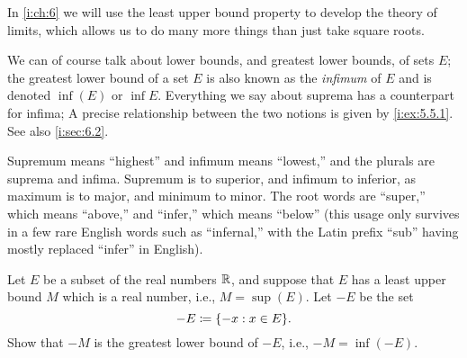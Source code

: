 \begin{rmk}\label{i:5.5.14}
  In \cref{i:ch:6} we will use the least upper bound property to develop the theory of limits, which allows us to do many more things than just take square roots.
\end{rmk}

\begin{rmk}\label{i:5.5.15}
  We can of course talk about lower bounds, and greatest lower bounds, of sets \(E\);
  the greatest lower bound of a set \(E\) is also known as the \emph{infimum} of \(E\) and is denoted \(\inf(E)\) or \(\inf E\).
  Everything we say about suprema has a counterpart for infima;
  A precise relationship between the two notions is given by \cref{i:ex:5.5.1}.
  See also \cref{i:sec:6.2}.
\end{rmk}

\begin{note}
  Supremum means ``highest'' and infimum means ``lowest,'' and the plurals are suprema and infima.
  Supremum is to superior, and infimum to inferior, as maximum is to major, and minimum to minor.
  The root words are ``super,'' which means ``above,'' and ``infer,'' which means ``below''
  (this usage only survives in a few rare English words such as ``infernal,'' with the Latin prefix ``sub'' having mostly replaced ``infer'' in English).
\end{note}

\exercisesection

\begin{ex}\label{i:ex:5.5.1}
  Let \(E\) be a subset of the real numbers \(\mathbb{R}\), and suppose that \(E\) has a least upper bound \(M\) which is a real number, i.e., \(M = \sup(E)\).
  Let \(-E\) be the set
  \[
    -E \coloneqq \set{-x : x \in E}.
  \]
  Show that \(-M\) is the greatest lower bound of \(-E\), i.e., \(-M = \inf(-E)\).
\end{ex}


